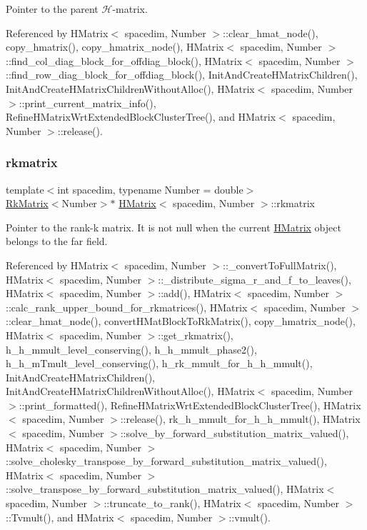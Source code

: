 Pointer to the parent $\mathcal{H}$-\/matrix. 

Referenced by H\+Matrix$<$ spacedim, Number $>$\+::clear\+\_\+hmat\+\_\+node(), copy\+\_\+hmatrix(), copy\+\_\+hmatrix\+\_\+node(), H\+Matrix$<$ spacedim, Number $>$\+::find\+\_\+col\+\_\+diag\+\_\+block\+\_\+for\+\_\+offdiag\+\_\+block(), H\+Matrix$<$ spacedim, Number $>$\+::find\+\_\+row\+\_\+diag\+\_\+block\+\_\+for\+\_\+offdiag\+\_\+block(), Init\+And\+Create\+H\+Matrix\+Children(), Init\+And\+Create\+H\+Matrix\+Children\+Without\+Alloc(), H\+Matrix$<$ spacedim, Number $>$\+::print\+\_\+current\+\_\+matrix\+\_\+info(), Refine\+H\+Matrix\+Wrt\+Extended\+Block\+Cluster\+Tree(), and H\+Matrix$<$ spacedim, Number $>$\+::release().

\mbox{\label{classHMatrix_aa97a8f5e42aba0f1d5faf41f35a27819}} 
\subsubsection{\texorpdfstring{rkmatrix}{rkmatrix}}
{\footnotesize\ttfamily template$<$int spacedim, typename Number = double$>$ \\
\hyperlink{classRkMatrix}{Rk\+Matrix}$<$Number$>$$\ast$ \hyperlink{classHMatrix}{H\+Matrix}$<$ spacedim, Number $>$\+::rkmatrix\hspace{0.3cm}{\ttfamily [private]}}

Pointer to the rank-\/k matrix. It is not null when the current \hyperlink{classHMatrix}{H\+Matrix} object belongs to the far field. 

Referenced by H\+Matrix$<$ spacedim, Number $>$\+::\+\_\+convert\+To\+Full\+Matrix(), H\+Matrix$<$ spacedim, Number $>$\+::\+\_\+distribute\+\_\+sigma\+\_\+r\+\_\+and\+\_\+f\+\_\+to\+\_\+leaves(), H\+Matrix$<$ spacedim, Number $>$\+::add(), H\+Matrix$<$ spacedim, Number $>$\+::calc\+\_\+rank\+\_\+upper\+\_\+bound\+\_\+for\+\_\+rkmatrices(), H\+Matrix$<$ spacedim, Number $>$\+::clear\+\_\+hmat\+\_\+node(), convert\+H\+Mat\+Block\+To\+Rk\+Matrix(), copy\+\_\+hmatrix\+\_\+node(), H\+Matrix$<$ spacedim, Number $>$\+::get\+\_\+rkmatrix(), h\+\_\+h\+\_\+mmult\+\_\+level\+\_\+conserving(), h\+\_\+h\+\_\+mmult\+\_\+phase2(), h\+\_\+h\+\_\+m\+Tmult\+\_\+level\+\_\+conserving(), h\+\_\+rk\+\_\+mmult\+\_\+for\+\_\+h\+\_\+h\+\_\+mmult(), Init\+And\+Create\+H\+Matrix\+Children(), Init\+And\+Create\+H\+Matrix\+Children\+Without\+Alloc(), H\+Matrix$<$ spacedim, Number $>$\+::print\+\_\+formatted(), Refine\+H\+Matrix\+Wrt\+Extended\+Block\+Cluster\+Tree(), H\+Matrix$<$ spacedim, Number $>$\+::release(), rk\+\_\+h\+\_\+mmult\+\_\+for\+\_\+h\+\_\+h\+\_\+mmult(), H\+Matrix$<$ spacedim, Number $>$\+::solve\+\_\+by\+\_\+forward\+\_\+substitution\+\_\+matrix\+\_\+valued(), H\+Matrix$<$ spacedim, Number $>$\+::solve\+\_\+cholesky\+\_\+transpose\+\_\+by\+\_\+forward\+\_\+substitution\+\_\+matrix\+\_\+valued(), H\+Matrix$<$ spacedim, Number $>$\+::solve\+\_\+transpose\+\_\+by\+\_\+forward\+\_\+substitution\+\_\+matrix\+\_\+valued(), H\+Matrix$<$ spacedim, Number $>$\+::truncate\+\_\+to\+\_\+rank(), H\+Matrix$<$ spacedim, Number $>$\+::\+Tvmult(), and H\+Matrix$<$ spacedim, Number $>$\+::vmult().

